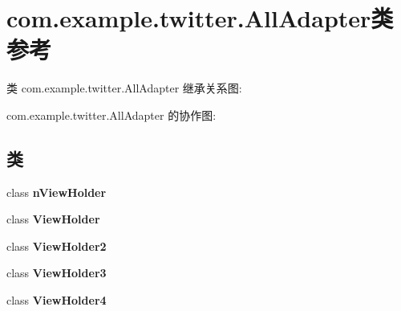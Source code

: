 \hypertarget{classcom_1_1example_1_1twitter_1_1_all_adapter}{}\section{com.\+example.\+twitter.\+All\+Adapter类 参考}
\label{classcom_1_1example_1_1twitter_1_1_all_adapter}


类 com.\+example.\+twitter.\+All\+Adapter 继承关系图\+:


com.\+example.\+twitter.\+All\+Adapter 的协作图\+:
\subsection*{类}
\begin{DoxyCompactItemize}
\item 
class {\bfseries n\+View\+Holder}
\item 
class {\bfseries View\+Holder}
\item 
class {\bfseries View\+Holder2}
\item 
class {\bfseries View\+Holder3}
\item 
class {\bfseries View\+Holder4}
\end{DoxyCompactItemize}
